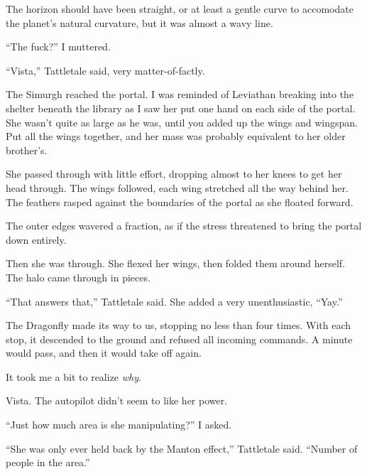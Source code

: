 The horizon should have been straight, or at least a gentle curve to accomodate the planet's natural curvature, but it was almost a wavy line.



``The fuck?'' I muttered.



``Vista,'' Tattletale said, very matter-of-factly.



The Simurgh reached the portal.  I was reminded of Leviathan breaking into the shelter beneath the library as I saw her put one hand on each side of the portal.  She wasn't quite as large as he was, until you added up the wings and wingspan.  Put all the wings together, and her mass was probably equivalent to her older brother's.



She passed through with little effort, dropping almost to her knees to get her head through.  The wings followed, each wing stretched all the way behind her.  The feathers rasped against the boundaries of the portal as she floated forward.



The outer edges wavered a fraction, as if the stress threatened to bring the portal down entirely.



Then she was through.  She flexed her wings, then folded them around herself.  The halo came through in pieces.



``That answers that,'' Tattletale said.  She added a very unenthusiastic, ``Yay.''



The Dragonfly made its way to us, stopping no less than four times.  With each stop, it descended to the ground and refused all incoming commands.  A minute would pass, and then it would take off again.



It took me a bit to realize \emph{why}.



Vista.  The autopilot didn't seem to like her power.



``Just how much area is she manipulating?'' I asked.



``She was only ever held back by the Manton effect,'' Tattletale said.  ``Number of people in the area.''




